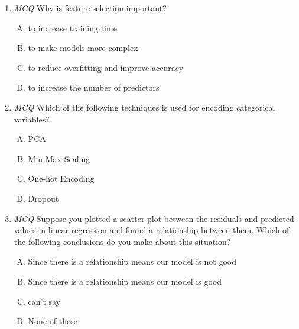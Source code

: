 \documentclass[11pt, a4paper]{article}
\begin{document}
\begin{enumerate}[1.]
	
\item \textit{MCQ} Why is feature selection important?
	\begin{enumerate}[(A)]
		\item to increase training time
		\item to make models more complex
		\item to reduce overfitting and improve accuracy
		\item to increase the number of predictors
	\end{enumerate}
	

\item \textit{MCQ} Which of the following techniques is used for encoding categorical variables?
	\begin{enumerate}[(A)]
		\item PCA	
		\item Min-Max Scaling
		\item One-hot Encoding
		\item Dropout
	\end{enumerate}
	

\item \textit{MCQ} Suppose you plotted a scatter plot between the residuals and predicted values in linear regression and found a relationship between them. Which of the following conclusions do you make about this situation?
	\begin{enumerate}[(A)]
		\item Since there is a relationship means our model is not good
		\item Since there is a relationship means our model is good
		\item can’t say
		\item None of these
	\end{enumerate}
	
\end{enumerate}
\end{document}

